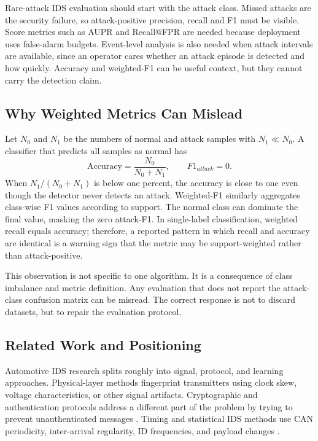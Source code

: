\documentclass[runningheads]{llncs}
\begin{document}
Rare-attack IDS evaluation should start with the attack class.  Missed attacks are the security failure, so attack-positive precision, recall and F1 must be visible.  Score metrics such as AUPR and Recall@FPR are needed because deployment uses false-alarm budgets.  Event-level analysis is also needed when attack intervals are available, since an operator cares whether an attack episode is detected and how quickly.  Accuracy and weighted-F1 can be useful context, but they cannot carry the detection claim.

\subsection{Why Weighted Metrics Can Mislead}
Let $N_0$ and $N_1$ be the numbers of normal and attack samples with $N_1 \ll N_0$.  A classifier that predicts all samples as normal has
\begin{equation}
    \mathrm{Accuracy}=\frac{N_0}{N_0+N_1}, \qquad F1_{attack}=0.
\end{equation}
When $N_1/(N_0+N_1)$ is below one percent, the accuracy is close to one even though the detector never detects an attack.  Weighted-F1 similarly aggregates class-wise F1 values according to support.  The normal class can dominate the final value, masking the zero attack-F1.  In single-label classification, weighted recall equals accuracy; therefore, a reported pattern in which recall and accuracy are identical is a warning sign that the metric may be support-weighted rather than attack-positive.

This observation is not specific to one algorithm.  It is a consequence of class imbalance and metric definition.  Any evaluation that does not report the attack-class confusion matrix can be misread.  The correct response is not to discard datasets, but to repair the evaluation protocol.

\subsection{Related Work and Positioning}
Automotive IDS research splits roughly into signal, protocol, and learning approaches.  Physical-layer methods fingerprint transmitters using clock skew, voltage characteristics, or other signal artifacts.  Cryptographic and authentication protocols address a different part of the problem by trying to prevent unauthenticated messages \cite{cho2016fingerprinting,cho2017viden,lu2019leap,lotto2024survey}.  Timing and statistical IDS methods use CAN periodicity, inter-arrival regularity, ID frequencies, and payload changes \cite{song2016intrusion,tyree2018shape}.
\end{document}
